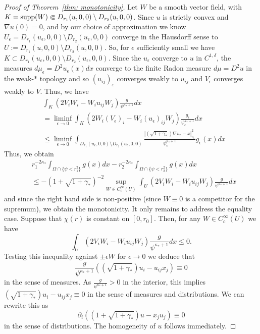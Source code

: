 \documentclass[12pt,reqno]{amsart}
\newcommand{\del}{\partial}
\newcommand{\eps}{\varepsilon}
\numberwithin{equation}{section}
\begin{document}
\begin{proof}[Proof of Theorem~\ref{thm: monotonicity}]
Let $W$ be a smooth vector field, with $K={\rm supp}(W) \Subset D_{r_1}(u,0,0)\setminus D_{r_2}(u,0,0)$. Since $u$ is strictly convex and $\nabla u(0)=0$, and by our choice of approximation we know $U_{\epsilon}= D_{r_1}(u_{\epsilon},0,0)\setminus D_{r_2}(u_{\epsilon},0,0)$ converge in the Hausdorff sense to $U:= D_{r_1}(u,0,0)\setminus D_{r_2}(u,0,0)$.  So, for  $\epsilon$ sufficiently small we have $K \subset D_{r_1}(u_{\epsilon},0,0)\setminus D_{r_2}(u_{\epsilon},0,0)$.  Since the $u_{\epsilon}$ converge to $u$ in $C^{1,\delta}$, the measures $d\mu_{\epsilon} =D^2u_\epsilon(x)dx$ converge to the finite Radon measure $d\mu = D^2u$ in the weak-$*$ topology and so $(u_{ij})_{\eps}$ converges weakly to $u_{ij}$ and $V_{\epsilon}$ converges weakly to $V$.  Thus, we have
\begin{equation}\label{eq: supLinFuncChar}
\begin{aligned}
&\int_{K} \left(2V_i W_i - W_iu_{ij}W_j\right)  \frac{g}{\psi^{\kappa_*+1}} dx \\
&= \liminf_{\epsilon \rightarrow 0}\int_{K} \left(2W_i(V_{\epsilon})_i - W_i(u_{\epsilon})_{ij}W_j\right) \frac{g_{\epsilon}}{\psi_{\epsilon}^{\kappa_*+1}} dx  \\
&\leq \liminf_{\epsilon \rightarrow 0}\int_{D_{r_1}(u_{\epsilon},0,0)\setminus D_{r_2}(u_{\epsilon},0,0)} \frac{|(\sqrt{1+\gamma_*})\nabla u_{\epsilon} -x|^2_{u_{\epsilon}}}{\psi_{\epsilon}^{\kappa_*+1}}g_{\epsilon}(x)dx
\end{aligned}
\end{equation}
Thus, we obtain
\[
\begin{aligned}
&r_1^{-2\kappa_{*}}\int_{\Omega \cap \{\psi<r_1^2\}} g(x)dx - r_2^{-2\kappa_{*}}\int_{\Omega \cap \{\psi<r_2^2\}} g(x)dx\\
&\leq -(1+\sqrt{1+\gamma_*})^{-2}\sup_{W\in C^{\infty}_{c}(U)}\int_{U} \left(2V_i W_i - W_iu_{ij}W_j\right)  \frac{g}{\psi^{\kappa_*+1}} dx
\end{aligned}
\]
and since the right hand side is non-positive (since $W\equiv 0$ is a competitor for the supremum), we obtain the monotonicity.  It only remains to address the equality case.  Suppose that $\chi(r)$ is constant on $[0,r_0]$.  Then, for any $W\in C^{\infty}_{c}(U)$ we have
\[
\int_{U} \left(2V_i W_i - W_iu_{ij}W_j\right)  \frac{g}{\psi^{\kappa_*+1}} dx\leq 0.
\]
Testing this inequality against $\pm \epsilon W$ for $\epsilon \rightarrow 0$ we deduce that 
\[
\frac{g}{\psi^{\kappa_*+1}}((\sqrt{1+\gamma_*})u_i -u_{ij}x_j) \equiv 0
\]
in the sense of measures.  As $\frac{g}{\psi^{\kappa_*+1}}>0$ in the interior, this implies $(\sqrt{1+\gamma_*})u_i -u_{ij}x_j \equiv 0$ in the sense of measures and distributions.  We can rewrite this as
\[
\del_i \left((1+\sqrt{1+\gamma_*})u-x_ju_j\right) \equiv 0
\]
in the sense of distributions.  The homogeneity of $u$ follows immediately.
\end{proof}
\end{document}
